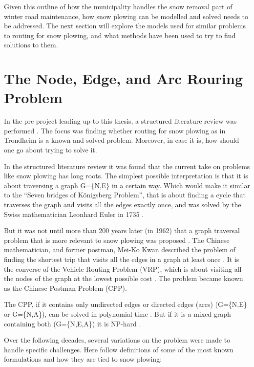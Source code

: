
Given this outline of how the municipality handles the snow removal part of winter road maintenance, how snow plowing can be modelled and solved needs to be addressed. The next section will explore the models used for similar problems to routing for snow plowing, and what methods have been used to try to find solutions to them.


\section{The Node, Edge, and Arc Rouring Problem}
\label{the_nearp}

In the pre project leading up to this thesis, a structured literature review was performed \citep{forprosjektet}. The focus was finding whether routing for snow plowing as in Trondheim is a known and solved problem. Moreover, in case it is, how should one go about trying to solve it.

In the structured literature review it was found that the current take on problems like snow plowing has long roots. The simplest possible interpretation is that it is about traversing a graph G=\{N,E\} in a certain way. Which would make it similar to the “Seven bridges of Königsberg Problem”, that is about finding a cycle that traverses the graph and visits all the edges exactly once, and was solved by the Swiss mathematician Leonhard Euler in 1735 \citep{eulerBridges}.

But it was not until more than 200 years later (in 1962) that a graph traversal problem that is more relevant to snow plowing was proposed \citep{wohlk2008decade}. The Chinese mathematician, and former postman, Mei-Ko Kwan described the problem of finding the shortest trip that visits all the edges in a graph at least once \citep{meiKoKwanCPP}. It is the converse of the Vehicle Routing Problem (VRP), which is about visiting all the nodes of the graph at the lowest possible cost \citep{laporte1992vehicle}. The problem became known as the Chinese Postman Problem (CPP).

The CPP, if it contains only undirected edges or directed edges (arcs) (G=\{N,E\} or G=\{N,A\}), can be solved in polynomial time \citep{wohlk2008decade}. But if it is a mixed graph containing both (G=\{N,E,A\}) it is NP-hard \citep{wohlk2008decade}.

Over the following decades, several variations on the problem were made to handle specific challenges. Here follow definitions of some of the most known formulations and how they are tied to snow plowing:

